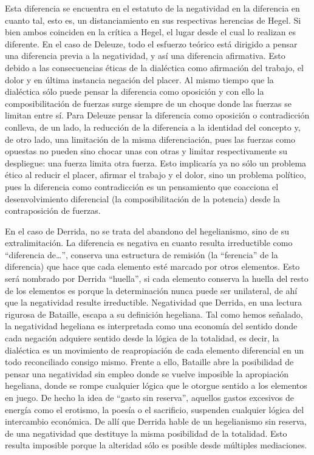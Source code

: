 Esta diferencia se encuentra en el estatuto de la negatividad en la diferencia en cuanto tal, esto es, un distanciamiento en sus respectivas herencias de Hegel. Si bien ambos coinciden en la crítica a Hegel, el lugar desde el cual lo realizan es diferente. En el caso de Deleuze, todo el esfuerzo teórico está dirigido a pensar una diferencia previa a la negatividad, y así una diferencia afirmativa. Esto debido a las consecuencias éticas de la dialéctica como afirmación del trabajo, el dolor y en última instancia negación del placer. Al mismo tiempo que la dialéctica sólo puede pensar la diferencia como oposición y con ello la composibilitación de fuerzas surge siempre de un choque donde las fuerzas se limitan entre sí. Para Deleuze pensar la diferencia como oposición o contradicción conlleva, de un lado, la reducción de la diferencia a la identidad del concepto y, de otro lado, una limitación de la misma diferenciación, pues las fuerzas como opuestas no pueden sino chocar unas con otras y limitar respectivamente su despliegue: una fuerza limita otra fuerza. Esto implicaría ya no sólo un problema ético al reducir el placer, afirmar el trabajo y el dolor, sino un problema político, pues la diferencia como contradicción es un pensamiento que coacciona el desenvolvimiento diferencial (la composibilitación de la potencia) desde la contraposición de fuerzas.

En el caso de Derrida, no se trata del abandono del hegelianismo, sino de su extralimitación. La diferencia es negativa en cuanto resulta irreductible como \enquote{diferencia de\ldots}, conserva una estructura de remisión (la \enquote{ferencia} de la diferencia) que hace que cada elemento esté marcado por otros elementos. Esto será nombrado por Derrida \enquote{huella}, si cada elemento conserva la huella del resto de los elementos es porque la determinación nunca puede ser unilateral, de ahí que la negatividad resulte irreductible. Negatividad que Derrida, en una lectura rigurosa de Bataille, escapa a su definición hegeliana. Tal como hemos señalado, la negatividad hegeliana es interpretada como una economía del sentido donde cada negación adquiere sentido desde la lógica de la totalidad, es decir, la dialéctica es un movimiento de reapropiación de cada elemento diferencial en un todo reconciliado consigo mismo. Frente a ello, Bataille abre la posibilidad de pensar una negatividad sin empleo donde se vuelve imposible la apropiación hegeliana, donde se rompe cualquier lógica que le otorgue sentido a los elementos en juego. De hecho la idea de \enquote{gasto sin reserva}, aquellos gastos excesivos de energía como el erotismo, la poesía o el sacrificio, suspenden cualquier lógica del intercambio económica. De allí que Derrida hable de un hegelianismo sin reserva, de una negatividad que destituye la misma posibilidad de la totalidad. Esto resulta imposible porque la alteridad sólo es posible desde múltiples mediaciones.

